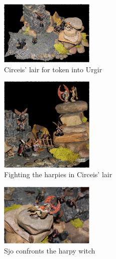 \begin{figure}[h]
	\centering
	\includegraphics[width=0.4\textwidth]{images/Circeis-lair-for-token-into-Urgir-587600250_mod.jpg}
	\caption{Circeis' lair for token into Urgir}
	\label{fig:Circeis-lair-for-token-into-Urgir-587600250}
\end{figure}

\begin{figure}[h]
	\centering
	\includegraphics[width=0.4\textwidth]{images/Fighting-the-harpies-in-Circeis-lair-587601733_mod.jpg}
	\caption{Fighting the harpies in Circeis' lair}
	\label{fig:Fighting-the-harpies-in-Circeis-lair-587601733}
\end{figure}

\begin{figure}[h]
	\centering
	\includegraphics[width=0.4\textwidth]{images/Sjo-confonts-the-harpy-witch-587602339_mod.jpg}
	\caption{Sjo confronts the harpy witch}
	\label{fig:Sjo-confonts-the-harpy-witch-587602339}
\end{figure}

